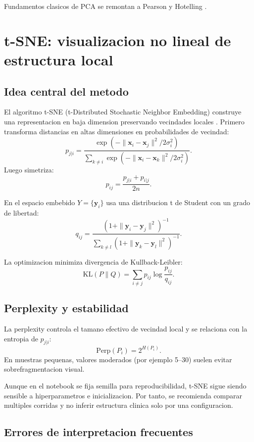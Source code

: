 \documentclass[12pt,a4paper,oneside]{report}
\begin{document}
Fundamentos clasicos de PCA se remontan a Pearson y Hotelling \cite{pearson1901,hotelling1933,jolliffe2002}.

\chapter{t-SNE: visualizacion no lineal de estructura local}

\section{Idea central del metodo}

El algoritmo t-SNE (t-Distributed Stochastic Neighbor Embedding) construye una representacion en baja dimension preservando vecindades locales \cite{maaten2008}. Primero transforma distancias en altas dimensiones en probabilidades de vecindad:
\[
p_{j|i} = \frac{\exp\left(-\|\mathbf{x}_i-\mathbf{x}_j\|^2 / 2\sigma_i^2\right)}{\sum_{k \ne i}\exp\left(-\|\mathbf{x}_i-\mathbf{x}_k\|^2 / 2\sigma_i^2\right)}.
\]
Luego simetriza:
\[
p_{ij} = \frac{p_{j|i} + p_{i|j}}{2n}.
\]

En el espacio embebido $Y = \{\mathbf{y}_i\}$ usa una distribucion t de Student con un grado de libertad:
\[
q_{ij} = \frac{\left(1+\|\mathbf{y}_i-\mathbf{y}_j\|^2\right)^{-1}}{\sum_{k\ne l}\left(1+\|\mathbf{y}_k-\mathbf{y}_l\|^2\right)^{-1}}.
\]

La optimizacion minimiza divergencia de Kullback-Leibler:
\[
\mathrm{KL}(P\|Q) = \sum_{i\ne j} p_{ij} \log\frac{p_{ij}}{q_{ij}}.
\]

\section{Perplexity y estabilidad}

La perplexity controla el tamano efectivo de vecindad local y se relaciona con la entropia de $p_{j|i}$:
\[
\mathrm{Perp}(P_i) = 2^{H(P_i)}.
\]
En muestras pequenas, valores moderados (por ejemplo 5--30) suelen evitar sobrefragmentacion visual.

Aunque en el notebook se fija semilla para reproducibilidad, t-SNE sigue siendo sensible a hiperparametros e inicializacion. Por tanto, se recomienda comparar multiples corridas y no inferir estructura clinica solo por una configuracion.

\section{Errores de interpretacion frecuentes}
\end{document}
